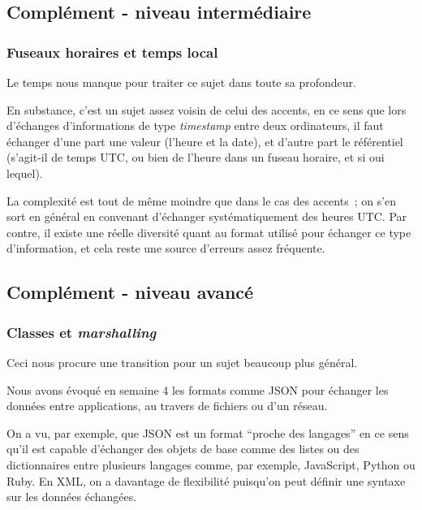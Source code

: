     \hypertarget{compluxe9ment---niveau-intermuxe9diaire}{%
\subsection{Complément - niveau
intermédiaire}\label{compluxe9ment---niveau-intermuxe9diaire}}

    \hypertarget{fuseaux-horaires-et-temps-local}{%
\subsubsection{Fuseaux horaires et temps
local}\label{fuseaux-horaires-et-temps-local}}

    Le temps nous manque pour traiter ce sujet dans toute sa profondeur.

En substance, c'est un sujet assez voisin de celui des accents, en ce
sens que lors d'échanges d'informations de type \emph{timestamp} entre
deux ordinateurs, il faut échanger d'une part une valeur (l'heure et la
date), et d'autre part le référentiel (s'agit-il de temps UTC, ou bien
de l'heure dans un fuseau horaire, et si oui lequel).

La complexité est tout de même moindre que dans le cas des accents~; on
s'en sort en général en convenant d'échanger systématiquement des heures
UTC. Par contre, il existe une réelle diversité quant au format utilisé
pour échanger ce type d'information, et cela reste une source d'erreurs
assez fréquente.

    \hypertarget{compluxe9ment---niveau-avancuxe9}{%
\subsection{Complément - niveau
avancé}\label{compluxe9ment---niveau-avancuxe9}}

    \hypertarget{classes-et-marshalling}{%
\subsubsection{\texorpdfstring{Classes et
\emph{marshalling}}{Classes et marshalling}}\label{classes-et-marshalling}}

    Ceci nous procure une transition pour un sujet beaucoup plus général.

Nous avons évoqué en semaine 4 les formats comme JSON pour échanger les
données entre applications, au travers de fichiers ou d'un réseau.

On a vu, par exemple, que JSON est un format ``proche des langages'' en
ce sens qu'il est capable d'échanger des objets de base comme des listes
ou des dictionnaires entre plusieurs langages comme, par exemple,
JavaScript, Python ou Ruby. En XML, on a davantage de flexibilité
puisqu'on peut définir une syntaxe sur les données échangées.

